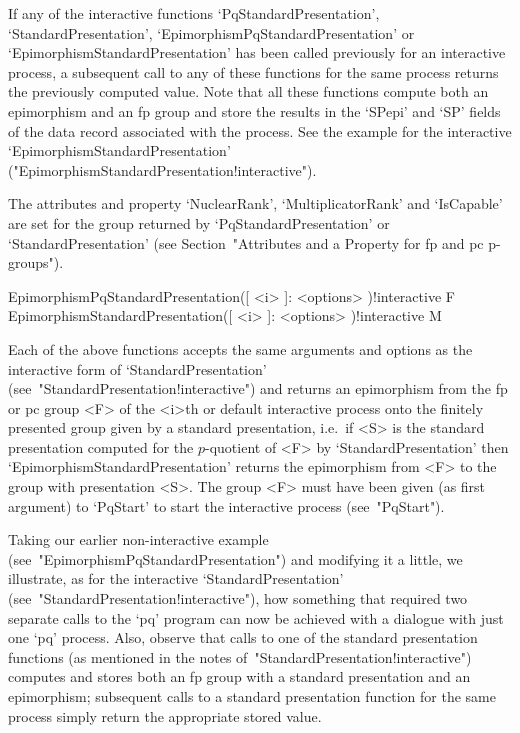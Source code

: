 If   any   of   the   interactive   functions   `PqStandardPresentation',
`StandardPresentation',      `EpimorphismPqStandardPresentation'       or
`EpimorphismStandardPresentation'  has  been  called  previously  for  an
interactive process, a subsequent call to any of these functions for  the
same process returns the previously computed value. Note that  all  these
functions compute both an epimorphism and  an  fp  group  and  store  the
results in the `SPepi' and `SP' fields of the data record associated with
the    process.    See    the     example     for     the     interactive
`EpimorphismStandardPresentation'
("EpimorphismStandardPresentation!interactive").

The  attributes  and  property  `NuclearRank',  `MultiplicatorRank'   and
`IsCapable' are set for the group returned by `PqStandardPresentation' or
`StandardPresentation' (see Section~"Attributes and a Property for fp and  
pc p-groups").

\>EpimorphismPqStandardPresentation([ <i> ]: <options> )!{interactive} F
\>EpimorphismStandardPresentation([ <i> ]: <options> )!{interactive} M

Each of the above functions accepts the same arguments and options as the
interactive           form           of            `StandardPresentation'
(see~"StandardPresentation!interactive") and returns an epimorphism  from
the fp or pc group <F> of  the  <i>th  or  default  interactive  {\ANUPQ}
process  onto  the  finitely  presented  group  given   by   a   standard
presentation, i.e.~if <S> is the standard presentation computed  for  the
$p$-quotient     of     <F>      by      `StandardPresentation'      then
`EpimorphismStandardPresentation' returns the epimorphism from <F> to the
group with presentation <S>. The group <F> must have been given (as first
argument)  to  `PqStart'  to  start  the  interactive  {\ANUPQ}   process
(see~"PqStart").

Taking        our         earlier         non-interactive         example
(see~"EpimorphismPqStandardPresentation") and modifying it a  little,  we
illustrate,    as    for    the    interactive     `StandardPresentation'
(see~"StandardPresentation!interactive"), how something that required two
separate calls to the `pq' program can now be achieved  with  a  dialogue
with just one `pq' process. Also,  observe  that  calls  to  one  of  the
standard   presentation   functions   (as   mentioned   in   the    notes
of~"StandardPresentation!interactive") computes and  stores  both  an  fp
group with a standard presentation and an epimorphism;  subsequent  calls
to a standard presentation function for the same  process  simply  return
the appropriate stored value.

